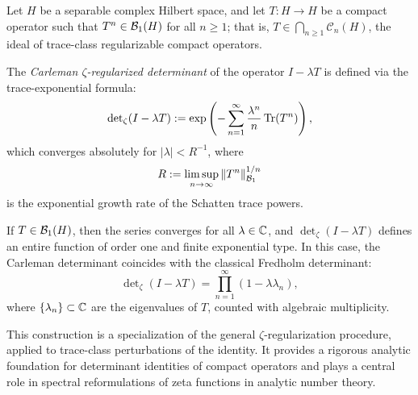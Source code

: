 \begin{definition}
\label{def:carleman_zeta_determinant}
Let \( H \) be a separable complex Hilbert space, and let \( T \colon H \to H \) be a compact operator such that \( T^n \in \mathcal{B}_1(H) \) for all \( n \ge 1 \); that is, \( T \in \bigcap_{n \ge 1} \mathcal{C}_n(H) \), the ideal of trace-class regularizable compact operators.

\medskip
\noindent
The \emph{Carleman \(\zeta\)-regularized determinant} of the operator \( I - \lambda T \) is defined via the trace-exponential formula:
\[
\det\nolimits_\zeta(I - \lambda T) := \exp\left( - \sum_{n=1}^\infty \frac{\lambda^n}{n} \operatorname{Tr}(T^n) \right),
\]
which converges absolutely for \( |\lambda| < R^{-1} \), where
\[
R := \limsup_{n \to \infty} \|T^n\|_{\mathcal{B}_1}^{1/n}
\]
is the exponential growth rate of the Schatten trace powers.

\medskip
\noindent
If \( T \in \mathcal{B}_1(H) \), then the series converges for all \( \lambda \in \mathbb{C} \), and \( \det\nolimits_\zeta(I - \lambda T) \) defines an entire function of order one and finite exponential type. In this case, the Carleman determinant coincides with the classical Fredholm determinant:
\[
\det\nolimits_\zeta(I - \lambda T)
= \prod_{n=1}^\infty (1 - \lambda \lambda_n),
\]
where \( \{ \lambda_n \} \subset \mathbb{C} \) are the eigenvalues of \( T \), counted with algebraic multiplicity.

\medskip
\noindent
This construction is a specialization of the general \(\zeta\)-regularization procedure, applied to trace-class perturbations of the identity. It provides a rigorous analytic foundation for determinant identities of compact operators and plays a central role in spectral reformulations of zeta functions in analytic number theory.
\end{definition}
